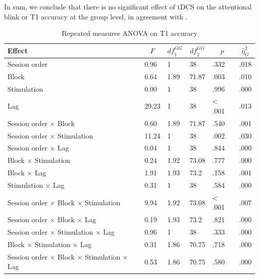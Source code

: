 \documentclass[11pt,]{memoir}
\begin{document}
In sum, we conclude that there is no significant effect of tDCS on the attentional blink or T1 accuracy at the group level, in agreement with \textcite{London2015}.

\begin{table}[tbp]
\begin{center}
\begin{threeparttable}
\caption{\label{tab:tab-anova-T1}Repeated measures ANOVA on T1 accuracy}
\small{
\begin{tabular}{llllll}
\toprule
Effect & \multicolumn{1}{c}{$F$} & \multicolumn{1}{c}{$\mathit{df}_1^{GG}$} & \multicolumn{1}{c}{$\mathit{df}_2^{GG}$} & \multicolumn{1}{c}{$p$} & \multicolumn{1}{c}{$\hat{\eta}^2_G$}\\
\midrule
Session order & 0.96 & 1 & 38 & .332 & .018\\
Block & 6.64 & 1.89 & 71.87 & .003 & .010\\
Stimulation & 0.00 & 1 & 38 & .996 & .000\\
Lag & 29.23 & 1 & 38 & < .001 & .013\\
Session order $\times$ Block & 0.60 & 1.89 & 71.87 & .540 & .001\\
Session order $\times$ Stimulation & 11.24 & 1 & 38 & .002 & .030\\
Session order $\times$ Lag & 0.04 & 1 & 38 & .844 & .000\\
Block $\times$ Stimulation & 0.24 & 1.92 & 73.08 & .777 & .000\\
Block $\times$ Lag & 1.91 & 1.93 & 73.2 & .158 & .001\\
Stimulation $\times$ Lag & 0.31 & 1 & 38 & .584 & .000\\
Session order $\times$ Block $\times$ Stimulation & 9.94 & 1.92 & 73.08 & < .001 & .007\\
Session order $\times$ Block $\times$ Lag & 0.19 & 1.93 & 73.2 & .821 & .000\\
Session order $\times$ Stimulation $\times$ Lag & 0.96 & 1 & 38 & .333 & .000\\
Block $\times$ Stimulation $\times$ Lag & 0.31 & 1.86 & 70.75 & .718 & .000\\
Session order $\times$ Block $\times$ Stimulation $\times$ Lag & 0.53 & 1.86 & 70.75 & .580 & .000\\
\bottomrule
\end{tabular}
}
\end{threeparttable}
\end{center}
\end{table}
\end{document}
